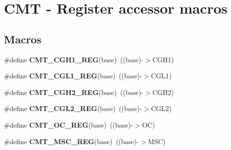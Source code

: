 \hypertarget{group__CMT__Register__Accessor__Macros}{}\section{C\+MT -\/ Register accessor macros}
\label{group__CMT__Register__Accessor__Macros}
\subsection*{Macros}
\begin{DoxyCompactItemize}
\item 
\#define {\bfseries C\+M\+T\+\_\+\+C\+G\+H1\+\_\+\+R\+EG}(base)~((base)-\/$>$C\+G\+H1)\hypertarget{group__CMT__Register__Accessor__Macros_gae0c4248d6bbae5002cde593a63e7a88d}{}\label{group__CMT__Register__Accessor__Macros_gae0c4248d6bbae5002cde593a63e7a88d}

\item 
\#define {\bfseries C\+M\+T\+\_\+\+C\+G\+L1\+\_\+\+R\+EG}(base)~((base)-\/$>$C\+G\+L1)\hypertarget{group__CMT__Register__Accessor__Macros_ga3488ddc2e45f9044b0b46e345d1261b7}{}\label{group__CMT__Register__Accessor__Macros_ga3488ddc2e45f9044b0b46e345d1261b7}

\item 
\#define {\bfseries C\+M\+T\+\_\+\+C\+G\+H2\+\_\+\+R\+EG}(base)~((base)-\/$>$C\+G\+H2)\hypertarget{group__CMT__Register__Accessor__Macros_ga50a0987ef8a1ae8ac3252301041b3aa7}{}\label{group__CMT__Register__Accessor__Macros_ga50a0987ef8a1ae8ac3252301041b3aa7}

\item 
\#define {\bfseries C\+M\+T\+\_\+\+C\+G\+L2\+\_\+\+R\+EG}(base)~((base)-\/$>$C\+G\+L2)\hypertarget{group__CMT__Register__Accessor__Macros_ga3a75e1bfd0e7c0d7ce90434a3840a279}{}\label{group__CMT__Register__Accessor__Macros_ga3a75e1bfd0e7c0d7ce90434a3840a279}

\item 
\#define {\bfseries C\+M\+T\+\_\+\+O\+C\+\_\+\+R\+EG}(base)~((base)-\/$>$OC)\hypertarget{group__CMT__Register__Accessor__Macros_ga87fac7a794d52c22ec21adb7f7b4620f}{}\label{group__CMT__Register__Accessor__Macros_ga87fac7a794d52c22ec21adb7f7b4620f}

\item 
\#define {\bfseries C\+M\+T\+\_\+\+M\+S\+C\+\_\+\+R\+EG}(base)~((base)-\/$>$M\+SC)\hypertarget{group__CMT__Register__Accessor__Macros_ga2db08983c0d04466f2ca30c355d1f033}{}\label{group__CMT__Register__Accessor__Macros_ga2db08983c0d04466f2ca30c355d1f033}


\end{DoxyCompactItemize}

